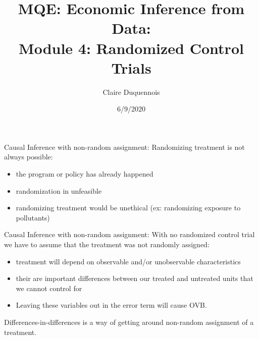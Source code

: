 \documentclass[
  ignorenonframetext,
]{beamer}
\title{MQE: Economic Inference from Data:\\
Module 4: Randomized Control Trials}
\author{Claire Duquennois}
\date{6/9/2020}
\begin{document}
\frame{\titlepage}

\begin{frame}{Causal Inference with non-random assignment:}
\protect\hypertarget{causal-inference-with-non-random-assignment}{}
Randomizing treatment is not always possible:

\begin{itemize}
\item
  the program or policy has already happened
\item
  randomization in unfeasible
\item
  randomizing treatment would be unethical (ex: randomizing exposure to
  pollutants)
\end{itemize}
\end{frame}

\begin{frame}{Causal Inference with non-random assignment:}
\protect\hypertarget{causal-inference-with-non-random-assignment-1}{}
With no randomized control trial we have to assume that the treatment
was not randomly assigned:

\begin{itemize}
\item
  treatment will depend on observable and/or unobservable
  characteristics
\item
  their are important differences between our treated and untreated
  units that we cannot control for
\item
  Leaving these variables out in the error term will cause OVB.
\end{itemize}

Differences-in-differences is a way of getting around non-random
assignment of a treatment.
\end{frame}

\end{document}

